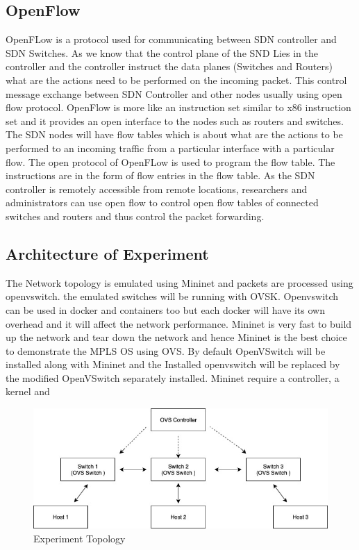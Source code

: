  
\subsection{OpenFlow} 

OpenFLow\cite{2016} is a protocol used for communicating between SDN controller and SDN Switches. As we know that the control plane of the SND Lies in the controller and the controller instruct the data planes (Switches and Routers) what are the actions need to be performed on the incoming packet. This control message exchange between SDN Controller and other nodes usually using open flow protocol. OpenFlow is more like an instruction set similar to x86 instruction set and it provides an open interface to the nodes such as routers and switches. The SDN nodes will have flow tables which is about what are the actions to be performed to an incoming traffic from a particular interface with a particular flow. The open protocol of  OpenFLow is used to program the flow table. The instructions are in the form of flow entries in the flow table. As the SDN controller is remotely accessible from remote locations, researchers and administrators can use open flow to control open flow tables of connected switches and routers and thus control the packet forwarding. \\
 
\subsection{Architecture of Experiment}

The Network topology is emulated using Mininet and packets are processed using openvswitch. the emulated switches will be running with OVSK. Openvswitch can be used in docker and containers too but each docker will have its own overhead and it will affect the network performance. Mininet is very fast to build up the network and tear down the network and hence Mininet is the best choice to demonstrate the MPLS OS using OVS. By default OpenVSwitch will be installed along with Mininet and the Installed openvswitch will be replaced by the modified OpenVSwitch separately installed. Mininet require a controller, a kernel and \\

\begin{figure}
       \centering\includegraphics[width=\textwidth]{Final/Experiment Topology.jpg}
       \caption{Experiment Topology}
       \label{fig:compbest}
\end{figure}

